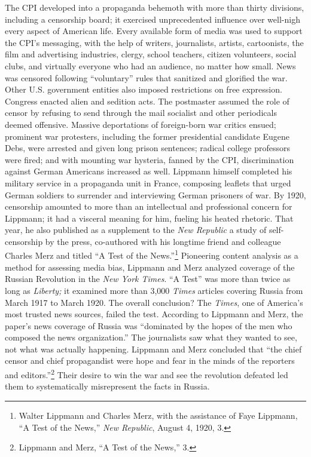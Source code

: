 \documentclass[openany,nobib,twoside,nohyper]{tufte-book}
\begin{document}
The CPI developed into a propaganda behemoth with more than thirty
divisions, including a censorship board; it exercised unprecedented
influence over well-nigh every aspect of American life. Every available
form of media was used to support the CPI's messaging, with the help of
writers, journalists, artists, cartoonists, the film and advertising
industries, clergy, school teachers, citizen volunteers, social clubs,
and virtually everyone who had an audience, no matter how small. News
was censored following ``voluntary'' rules that sanitized and glorified
the war. Other U.S. government entities also imposed restrictions on
free expression. Congress enacted alien and sedition acts. The
postmaster assumed the role of censor by refusing to send through the
mail socialist and other periodicals deemed offensive. Massive
deportations of foreign-born war critics ensued; prominent war
protesters, including the former presidential candidate Eugene Debs,
were arrested and given long prison sentences; radical college
professors were fired; and with mounting war hysteria, fanned by the
CPI, discrimination against German Americans increased as well. Lippmann
himself completed his military service in a propaganda unit in France,
composing leaflets that urged German soldiers to surrender and
interviewing German prisoners of war.
\clearpage
By 1920, censorship amounted to more than an intellectual and
professional concern for Lippmann; it had a visceral meaning for him,
fueling his heated rhetoric. That year, he also published as a
supplement to the \emph{New Republic} a study of self-censorship by the
press, co-authored with his longtime friend and colleague Charles
Merz and titled ``A Test of the
News.''\footnote{Walter Lippmann and Charles Merz, with the assistance of Faye
  Lippmann, ``A Test of the News,'' \emph{New Republic}, August 4, 1920,
  3.} Pioneering content analysis
as a method for assessing media bias, Lippmann and Merz analyzed
coverage of the Russian Revolution in the \emph{New York Times}. ``A
Test'' was more than twice as long as \emph{Liberty;} it examined more
than 3,000 \emph{Times} articles covering Russia from March 1917 to
March 1920. The overall conclusion? The \emph{Times}, one of America's
most trusted news sources, failed the test. According to Lippmann and
Merz, the paper's news coverage of Russia was ``dominated by the hopes
of the men who composed the news organization.'' The journalists saw
what they wanted to see, not what was actually happening. Lippmann and
Merz concluded that ``the chief censor and chief propagandist were hope
and fear in the minds of the reporters and
editors.''\footnote{Lippmann and Merz, ``A Test of the News,'' 3.} Their desire to win the
war and see the revolution defeated led them to systematically
misrepresent the facts in Russia.
\end{document}
